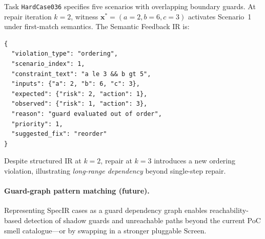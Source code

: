 Task \texttt{HardCase036} specifies five scenarios with overlapping boundary
guards.  At repair iteration $k=2$, witness $\mathbf{x}^*=(a=2,b=6,c=3)$
activates Scenario~1 under first-match semantics.  The Semantic Feedback IR is:

\begin{lstlisting}[language={},caption={Semantic Feedback IR (iteration 2).},
  label=lst:failure-ir]
{
  "violation_type": "ordering",
  "scenario_index": 1,
  "constraint_text": "a le 3 && b gt 5",
  "inputs": {"a": 2, "b": 6, "c": 3},
  "expected": {"risk": 2, "action": 1},
  "observed": {"risk": 1, "action": 3},
  "reason": "guard evaluated out of order",
  "priority": 1,
  "suggested_fix": "reorder"
}
\end{lstlisting}

Despite structured IR at $k=2$, repair at $k=3$ introduces a new ordering
violation, illustrating \emph{long-range dependency} beyond single-step repair.

\paragraph{Guard-graph pattern matching (future).}
Representing SpecIR cases as a guard dependency graph enables reachability-based
detection of shadow guards and unreachable paths beyond the current PoC
smell catalogue---or by swapping in a stronger pluggable $\mathrm{Screen}$.


